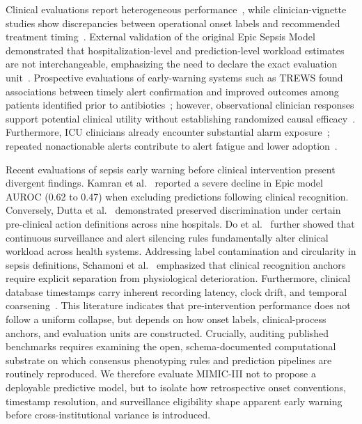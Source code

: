 \documentclass[12pt,a4paper]{article}
\begin{document}
Clinical evaluations report heterogeneous performance~\cite{wong2021external,adams2022prospective}, while clinician-vignette studies show discrepancies between operational onset labels and recommended treatment timing~\cite{weissman2024sepsis}. External validation of the original Epic Sepsis Model demonstrated that hospitalization-level and prediction-level workload estimates are not interchangeable, emphasizing the need to declare the exact evaluation unit~\cite{wong2021external}. Prospective evaluations of early-warning systems such as TREWS found associations between timely alert confirmation and improved outcomes among patients identified prior to antibiotics~\cite{adams2022prospective,henry2022factors}; however, observational clinician responses support potential clinical utility without establishing randomized causal efficacy~\cite{adams2022prospective}. Furthermore, ICU clinicians already encounter substantial alarm exposure~\cite{drew2014insights}; repeated nonactionable alerts contribute to alert fatigue and lower adoption~\cite{ancker2017effects,paine2016systematic}.

Recent evaluations of sepsis early warning before clinical intervention present divergent findings. Kamran et al.~\cite{kamran2024evaluation} reported a severe decline in Epic model AUROC (0.62 to 0.47) when excluding predictions following clinical recognition. Conversely, Dutta et al.~\cite{dutta2026performance} demonstrated preserved discrimination under certain pre-clinical action definitions across nine hospitals. Do et al.~\cite{do2026continuous} further showed that continuous surveillance and alert silencing rules fundamentally alter clinical workload across health systems. Addressing label contamination and circularity in sepsis definitions, Schamoni et al.~\cite{schamoni2019leveraging} emphasized that clinical recognition anchors require explicit separation from physiological deterioration. Furthermore, clinical database timestamps carry inherent recording latency, clock drift, and temporal coarsening~\cite{vandervegt2022timing}. This literature indicates that pre-intervention performance does not follow a uniform collapse, but depends on how onset labels, clinical-process anchors, and evaluation units are constructed. Crucially, auditing published benchmarks requires examining the open, schema-documented computational substrate on which consensus phenotyping rules and prediction pipelines are routinely reproduced. We therefore evaluate MIMIC-III not to propose a deployable predictive model, but to isolate how retrospective onset conventions, timestamp resolution, and surveillance eligibility shape apparent early warning before cross-institutional variance is introduced.
\end{document}
